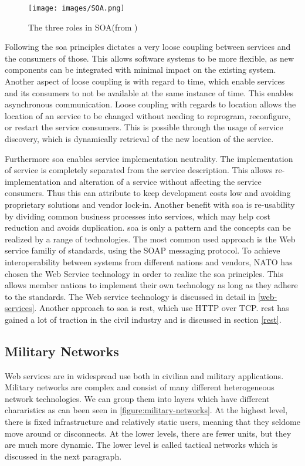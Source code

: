 \documentclass[USenglish]{ifimaster}
\begin{document}
\begin{figure}[h]
\texttt{[image: images/SOA.png]}
\caption{The three roles in SOA(from \cite{ist-090})}
\end{figure}

Following the \gls{soa} principles dictates a very loose coupling between
services and the consumers of those. This allows software systems to be more
flexible, as new components can be integrated with minimal impact on the
existing system. Another aspect of loose coupling is with regard to time, which
enable services and its consumers to not be available at the same instance of
time. This enables asynchronous communication. Loose coupling with regards to
location allows the location of an service to be changed without needing to
reprogram, reconfigure, or restart the service consumers. This is possible
through the usage of service discovery, which is dynamically retrieval of the
new location of the service.

 Furthermore \gls{soa} enables service implementation neutrality. The
 implementation of service is completely separated from the service description.
 This allows re-implementation and alteration of a service without affecting the
 service consumers. Thus this can attribute to keep development costs low and
 avoiding proprietary solutions and vendor lock-in. Another benefit with
 \gls{soa} is re-usability by dividing common business processes into services,
 which may help cost reduction and avoids duplication. \gls{soa} is only a
 pattern and the concepts can be realized by a range of technologies. The most
 common used approach is the Web service familiy of standards, using the SOAP
 messaging protocol. To achieve interoperability between systems from different
 nations and vendors, NATO has chosen the Web Service technology in order to
 realize the \gls{soa}  principles\cite{soa-baseline}. This allows member
 nations to implement their own technology as long as they adhere to the
 standards. The Web service technology is discussed in detail in
 \cref{web-services}. Another approach to \gls{soa} is \gls{rest}, which use
 HTTP over TCP. \gls{rest} has gained a lot of traction in the civil industry
 and is discussed in section \cref{rest}.


\subsection{Military Networks}

Web services are in widespread use both in civilian and military applications.
Military networks are complex and consist of many different heterogeneous
network technologies. We can group them into layers which have different
chararistics as can been seen in \cref{figure:military-networks}. At the highest
level, there is fixed infrastructure and relatively static users, meaning that
they seldome move around or disconnects. At the lower levels, there are fewer
units, but they are much more dynamic. The lower level is called tactical
networks which is discussed in the next paragraph.
\end{document}
